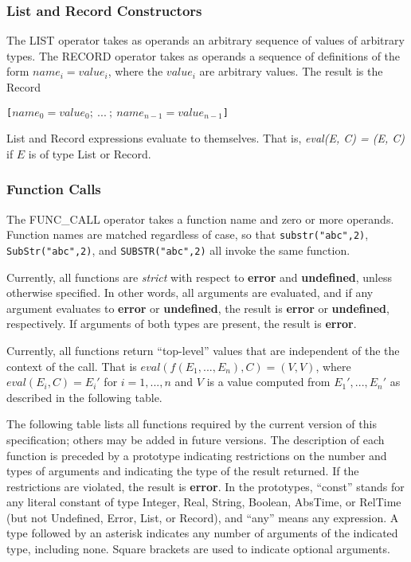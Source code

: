 \documentclass{article}
\begin{document}
\subsubsection{List and Record Constructors}
\label{sec:list_and_record}
The LIST operator takes as operands an arbitrary sequence of values of
arbitrary types.
The RECORD operator takes as operands a sequence of definitions of the form
$name_i = value_i$, where the $value_i$ are arbitrary values.  The result is
the Record
\begin{center}
\verb|[|$name_0 = value_0;~...~;~name_{n-1} = value_{n-1}$\verb|]|
\end{center}

List and Record expressions evaluate to themselves.
That is, \emph{eval(E, C) = (E, C)} if $E$ is of type List or Record.

\subsubsection{Function Calls}
\label{sec:functions}
The FUNC\_CALL operator takes a function name and zero or more operands.
Function names are matched regardless of case, so that
\texttt{substr("abc",2)},
\texttt{SubStr("abc",2)}, and
\texttt{SUBSTR("abc",2)} all invoke the same function.

Currently, all functions are \emph{strict} with respect to \textbf{error}
and \textbf{undefined}, unless otherwise specified.
In other words, all arguments are evaluated, and
if any argument evaluates to
\textbf{error} or \textbf{undefined}, the result is
\textbf{error} or \textbf{undefined}, respectively.
If arguments of both types are present, the result is \textbf{error}.

Currently, all functions return ``top-level'' values that are independent
of the the context of the call.  That is
$\mathit{eval}(f(E_1,...,E_n), C) = (V, V)$, where
$\mathit{eval}(E_i, C) = E_i'$ for $i = 1,...,n$ and $V$ is a value
computed from $E_1', ...,  E_n'$ as described in the following table.

The following table lists all functions required by the current version of this
specification; others may be added in future versions.
The description of each function is preceded by a prototype indicating
restrictions on the number and types of arguments and indicating the type of
the result returned.
If the restrictions are violated, the result is \textbf{error}.
In the prototypes, ``const'' stands for any literal constant of type Integer,
Real, String, Boolean, AbsTime, or RelTime (but not Undefined, Error, List, or
Record), and ``any'' means any expression.
A type followed by an asterisk indicates any number
of arguments of the indicated type, including none.
Square brackets are used to indicate optional arguments.
\end{document}
